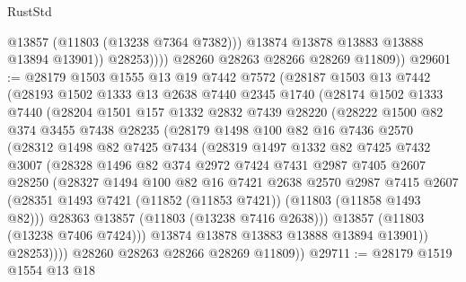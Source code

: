 \begin{lexlean}{RustStd}
\begin{coremodule}
                      @13857
                      (@11803 (@13238 @7364 @7382)))
                    @13874
                    @13878
                    @13883
                    @13888
                    @13894
                    @13901))
                @28253))))
        @28260
        @28263
        @28266
        @28269
        @11809))
@29601 := @28179
    @1503
    @1555
    @13
    @19
    @7442
    @7572
    (@28187
      @1503
      @13
      @7442
      (@28193
        @1502
        @1333
        @13
        @2638
        @7440
        @2345
        @1740
        (@28174
          @1502
          @1333
          @7440
          (@28204
            @1501
            @157
            @1332
            @2832
            @7439
            @28220
            (@28222
              @1500
              @82
              @374
              @3455
              @7438
              @28235
              (@28179
                @1498
                @100
                @82
                @16
                @7436
                @2570
                (@28312
                  @1498
                  @82
                  @7425
                  @7434
                  (@28319
                    @1497
                    @1332
                    @82
                    @7425
                    @7432
                    @3007
                    (@28328
                      @1496
                      @82
                      @374
                      @2972
                      @7424
                      @7431
                      @2987
                      @7405
                      @2607
                      @28250
                      (@28327
                        @1494
                        @100
                        @82
                        @16
                        @7421
                        @2638
                        @2570
                        @2987
                        @7415
                        @2607
                        (@28351 @1493 @7421 (@11852 (@11853 @7421)) (@11803 (@11858 @1493 @82)))
                        @28363
                        @13857
                        (@11803 (@13238 @7416 @2638)))
                      @13857
                      (@11803 (@13238 @7406 @7424)))
                    @13874
                    @13878
                    @13883
                    @13888
                    @13894
                    @13901))
                @28253))))
        @28260
        @28263
        @28266
        @28269
        @11809))
@29711 := @28179
    @1519
    @1554
    @13
    @18

\end{coremodule}
\end{lexlean}
